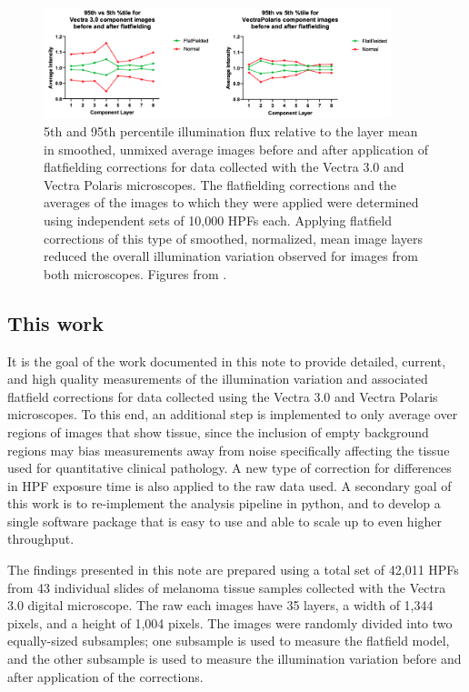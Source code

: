 \documentclass[letterpaper,11pt]{article}
\begin{document}
\begin{figure}[!ht]
\centering
\includegraphics[width=0.9\textwidth]{images/introduction/fourth_flatfield_impact}
\caption{\footnotesize 5th and 95th percentile illumination flux relative to the layer mean in smoothed, unmixed average images before and after application of flatfielding corrections for data collected with the Vectra 3.0 and Vectra Polaris microscopes. The flatfielding corrections and the averages of the images to which they were applied were determined using independent sets of 10,000 HPFs each. Applying flatfield corrections of this type of smoothed, normalized, mean image layers reduced the overall illumination variation observed for images from both microscopes. Figures from \cite{Ben_flatfielding_1}.}
\label{fig:fourth_flatfielding}
\end{figure}

\subsection{This work}
\label{ssec:this_work}

It is the goal of the work documented in this note to provide detailed, current, and high quality measurements of the illumination variation and associated flatfield corrections for data collected using the Vectra 3.0 and Vectra Polaris microscopes. To this end, an additional step is implemented to only average over regions of images that show tissue, since the inclusion of empty background regions may bias measurements away from noise specifically affecting the tissue used for quantitative clinical pathology. A new type of correction for differences in HPF exposure time is also applied to the raw data used. A secondary goal of this work is to re-implement the analysis pipeline in python, and to develop a single software package that is easy to use and able to scale up to even higher throughput.

The findings presented in this note are prepared using a total set of 42,011 HPFs from 43 individual slides of melanoma tissue samples collected with the Vectra 3.0 digital microscope. The raw each images have 35 layers, a width of 1,344 pixels, and a height of 1,004 pixels. The images were randomly divided into two equally-sized subsamples; one subsample is used to measure the flatfield model, and the other subsample is used to measure the illumination variation before and after application of the corrections.
\end{document}
